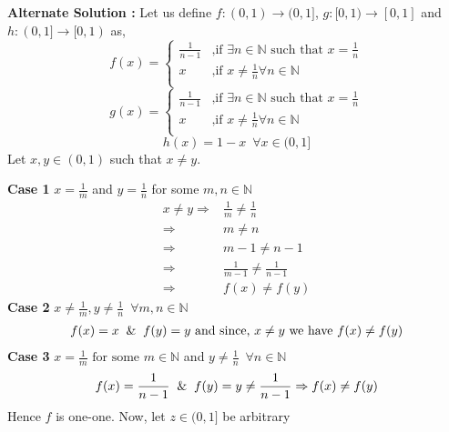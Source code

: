 \documentclass[10pt]{article}
\newcommand{\nn}{\mathbb{N}}
\begin{document}
\begin{enumerate}
	    \textbf{Alternate Solution : }Let us define $f : (0, 1) \to (0, 1]$, $g : [0, 1) \to [0, 1]$ and $h: (0,1] \to [0, 1)$ as, 
    \begin{equation*}
        f(x) = 
        \begin{cases}
            \frac{1}{n-1} & \text{,if } \exists n \in \nn \text{ such that }x = \frac{1}{n}\\
            x & \text{,if } x \neq \frac{1}{n} \forall n \in \nn \\
        \end{cases}
    \end{equation*}
    \begin{equation*}
        g(x) = 
        \begin{cases}
            \frac{1}{n-1} & \text{,if } \exists n \in \nn \text{ such that }x = \frac{1}{n}\\
            x & \text{,if } x \neq \frac{1}{n} \forall n \in \nn \\
        \end{cases}
    \end{equation*}
    $$h(x) = 1 - x\,\,\, \forall x \in (0,1]$$
    Let $x, y \in (0, 1)$ such that $x \neq y$.
    
    \textbf{Case 1} $x = \frac{1}{m}$ and $y = \frac{1}{n}$ for some $m,n \in \nn$
    \begin{align*}
        x \neq y
        \Rightarrow &\frac{1}{m} \neq \frac{1}{n} \\
        \Rightarrow &m \neq n \\
        \Rightarrow &m - 1 \neq n - 1 \\
        \Rightarrow &\frac{1}{m - 1} \neq \frac{1}{n - 1} \\
        \Rightarrow &f(x) \neq f(y)
    \end{align*}
    \textbf{Case 2} $x \neq \frac{1}{m}, y \neq \frac{1}{n} \,\,\, \forall m,n \in \nn$
        \begin{align*}
            f(x) = x \And f(y) = y\text{ and since, }x \neq y \text{ we have } f(x) \neq f(y)
        \end{align*}
    \textbf{Case 3} $x = \frac{1}{m} \text{ for some } m \in \nn$ and $y \neq \frac{1}{n} \,\,\, \forall n \in \nn$
    \begin{align*}
        f(x) = \frac{1}{n - 1} \And f(y) = y \neq \frac{1}{n - 1} \Rightarrow f(x) \neq f(y)
    \end{align*}
    Hence $f$ is one-one. Now, let $z \in (0, 1]$ be arbitrary
    

\end{enumerate}
\end{document}
